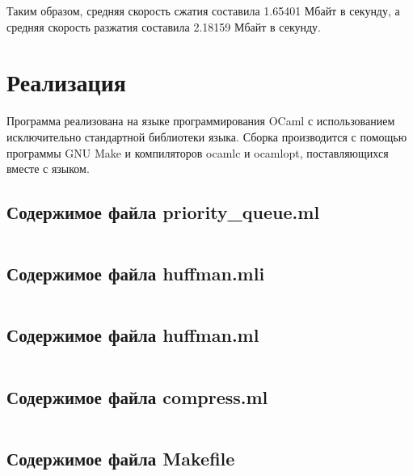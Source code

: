 \documentclass[a4paper,oneside]{article}
\theoremstyle{definition}
\begin{document}
Таким образом, средняя скорость сжатия составила 1.65401 Мбайт в секунду, а
средняя скорость разжатия составила 2.18159 Мбайт в секунду.


\section{Реализация}

Программа реализована на языке программирования OCaml с использованием
исключительно стандартной библиотеки языка. Сборка производится с помощью
программы GNU Make и компиляторов ocamlc и ocamlopt, поставляющихся вместе с
языком.

\subsection{Содержимое файла priority\_queue.ml}
\inputminted{ocaml}{../../lab1/priority_queue.ml}

\subsection{Содержимое файла huffman.mli}
\inputminted{ocaml}{../../lab1/huffman.mli}

\subsection{Содержимое файла huffman.ml}
\inputminted{ocaml}{../../lab1/huffman.ml}

\subsection{Содержимое файла compress.ml}
\inputminted{ocaml}{../../lab1/compress.ml}

\subsection{Содержимое файла Makefile}
\inputminted{ocaml}{../../lab1/Makefile}
\end{document}
